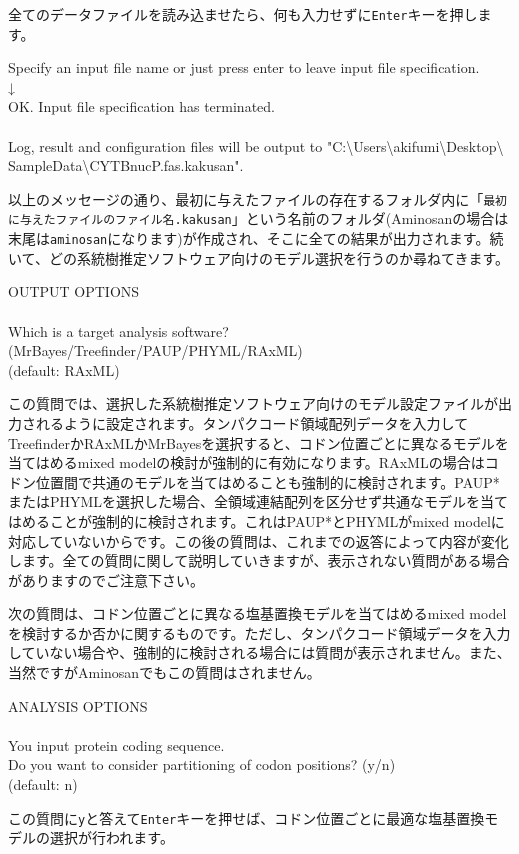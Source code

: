 \documentclass[titlepage,10pt,a4paper]{jsbook}
\newenvironment{cmd}{\begin{oframed}\raggedright\ttfamily\footnotesize\setlength{\baselineskip}{1.4em}}{\end{oframed}\vspace{-1em}}
\begin{document}
全てのデータファイルを読み込ませたら、何も入力せずに\texttt{Enter}キーを押します。
\begin{cmd}
Specify an input file name or just press enter to leave input file specification.\\
↓\\
OK. Input file specification has terminated.\\
~\\
Log, result and configuration files will be output to "C:{\textbackslash}Users{\textbackslash}akifumi{\textbackslash}Desktop{\textbackslash}\\
SampleData{\textbackslash}CYTBnuc{\textunderscore}P.fas.kakusan".
\end{cmd}
以上のメッセージの通り、最初に与えたファイルの存在するフォルダ内に「\texttt{最初に与えたファイルのファイル名.kakusan}」という名前のフォルダ(Aminosanの場合は末尾は\texttt{aminosan}になります)が作成され、そこに全ての結果が出力されます。続いて、どの系統樹推定ソフトウェア向けのモデル選択を行うのか尋ねてきます。
\begin{cmd}
OUTPUT OPTIONS\\
~\\
Which is a target analysis software? (MrBayes/Treefinder/PAUP/PHYML/RAxML)\\
(default: RAxML)
\end{cmd}
この質問では、選択した系統樹推定ソフトウェア向けのモデル設定ファイルが出力されるように設定されます。タンパクコード領域配列データを入力してTreefinderかRAxMLかMrBayesを選択すると、コドン位置ごとに異なるモデルを当てはめるmixed modelの検討が強制的に有効になります。RAxMLの場合はコドン位置間で共通のモデルを当てはめることも強制的に検討されます。PAUP*またはPHYMLを選択した場合、全領域連結配列を区分せず共通なモデルを当てはめることが強制的に検討されます。これはPAUP*とPHYMLがmixed modelに対応していないからです。この後の質問は、これまでの返答によって内容が変化します。全ての質問に関して説明していきますが、表示されない質問がある場合がありますのでご注意下さい。

次の質問は、コドン位置ごとに異なる塩基置換モデルを当てはめるmixed modelを検討するか否かに関するものです。ただし、タンパクコード領域データを入力していない場合や、強制的に検討される場合には質問が表示されません。また、当然ですがAminosanでもこの質問はされません。
\begin{cmd}
ANALYSIS OPTIONS\\
~\\
You input protein coding sequence.\\
Do you want to consider partitioning of codon positions? (y/n)\\
(default: n)
\end{cmd}
この質問に\texttt{y}と答えて\texttt{Enter}キーを押せば、コドン位置ごとに最適な塩基置換モデルの選択が行われます。
\end{document}
